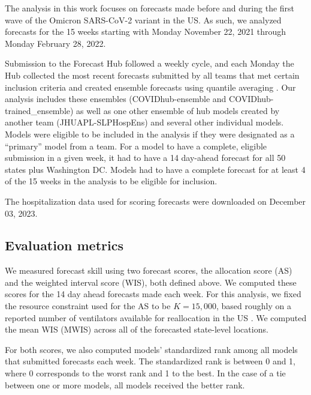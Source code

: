 \documentclass{article}\usepackage[]{graphicx}\usepackage[]{xcolor}
\begin{document}
The analysis in this work focuses on forecasts made before and during the first wave of the Omicron SARS-CoV-2 variant in the US.
As such, we analyzed forecasts for the 15 weeks starting with Monday November 22, 2021 through Monday February 28, 2022.

Submission to the Forecast Hub followed a weekly cycle, and each Monday the Hub collected the most recent forecasts submitted by all teams that met certain inclusion criteria and created ensemble forecasts using quantile averaging \citep{ray_comparing_2023}.
Our analysis includes these ensembles (COVIDhub-ensemble and COVIDhub-trained\_ensemble) as well as one other ensemble of hub models created by another team (JHUAPL-SLPHospEns) and several other individual models.
Models were eligible to be included in the analysis if they were designated as a ``primary'' model from a team. 
For a model to have a complete, eligible submission in a given week, it had to have a 14 day-ahead forecast for all 50 states plus Washington DC.
Models had to have a complete forecast for at least 4 of the 15 weeks in the analysis to be eligible for inclusion.

The hospitalization data used for scoring forecasts were downloaded on December 03, 2023.

\subsection{Evaluation metrics}

We measured forecast skill using two forecast scores, the allocation score (AS) and the weighted interval score (WIS), both defined above.
We computed these scores for the 14 day ahead forecasts made each week.
For this analysis, we fixed the resource constraint used for the AS to be $K=15,000$, based roughly on a reported number of ventilators available for reallocation in the US \citep{ajao_assessing_2015}.
We computed the mean WIS (MWIS) across all of the forecasted state-level locations.

For both scores, we also computed models' standardized rank among all models that submitted forecasts each week. The standardized rank is between 0 and 1, where 0 corresponds to the worst rank and 1 to the best. In the case of a tie between one or more models, all models received the better rank.
\end{document}

